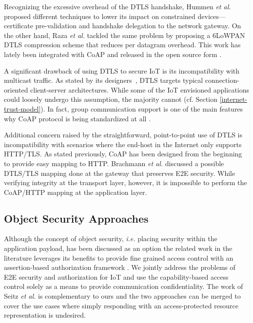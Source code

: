 \documentclass[conference]{IEEEtran}
\begin{document}
Recognizing the excessive overhead of the DTLS handshake, Hummen \emph{et al.}
\cite{hummen-certificate} proposed different techniques to lower its impact on
constrained devices---certificate pre-validation and handshake delegation to the
network gateway. On the other hand, Raza \emph{et al.} tackled the same problem
by proposing a 6LoWPAN DTLS compression scheme \cite{raza20126lowpan} that
reduces per datagram overhead. This work has lately been integrated with CoAP
and released in the open source form \cite{lithe}.






A significant drawback of using DTLS to secure IoT is its incompatibility with
multicast traffic. As stated by its designers~\cite{dtls}, DTLS targets
typical connection-oriented client-server architectures. While some of the IoT
envisioned applications could loosely undergo this assumption, the majority
cannot (cf. Section \ref{internet-trust-model}). In fact, group communication support is one of the main features why CoAP protocol is being standardized at all \cite{coap-draft}. 







Additional concern raised by the straightforward, point-to-point use of DTLS is
incompatibility with scenarios where the end-host in the Internet only supports HTTP/TLS. As stated previously, CoAP has been designed from the beginning to provide easy mapping to HTTP. Brachmann \emph{et al.} \cite{brachmann-e2e} discussed a possible DTLS/TLS mapping done at the gateway that preserves E2E security. While verifying integrity at the transport layer, however, it is impossible to perform the CoAP/HTTP mapping at the application layer.

\subsection{Object Security Approaches}
Although the concept of object security, \emph{i.e.} placing security within the
application payload, has been discussed as an option \cite{coap-draft,
  cirani2013enforcing} the related work in the literature leverages its benefits to provide fine grained access control with an assertion-based authorization framework \cite{authorization-framework}. We jointly address the problems of E2E security and authorization for IoT and use the
capability-based access control solely as a means to provide communication confidentiality. 
The work of Seitz \emph{et al.} \cite{authorization-framework} is complementary to ours and the
two approaches can be merged to cover the use cases where simply responding with an
access-protected resource representation is undesired.
\end{document}
